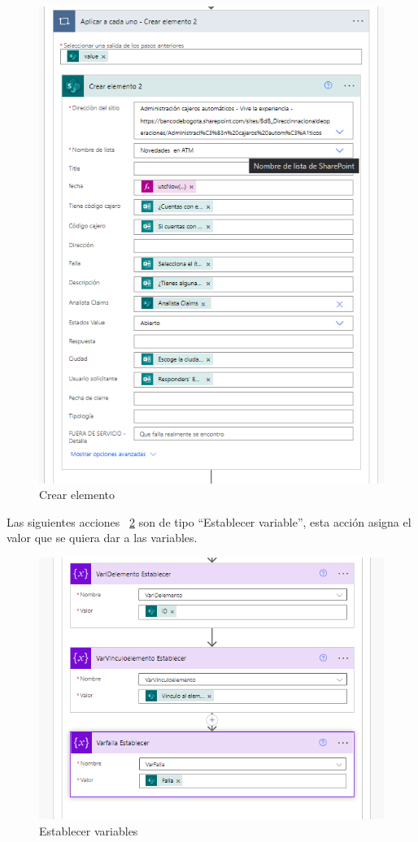 \begin{figure}[H]
	\centering
	\includegraphics[scale=0.5]{Capitulo3/imagenes/flujo5.png}
	\caption{Crear elemento}
	\label{fig:CElemento}
\end{figure}

Las siguientes acciones ~\ref{fig:EVariables} son de tipo ``Establecer variable'', esta acción  asigna el valor que se quiera dar a las variables.

\begin{figure}[H]
	\centering
	\includegraphics[scale=0.5]{Capitulo3/imagenes/flujo6.png}
	\caption{Establecer variables}
	\label{fig:EVariables}
\end{figure}

